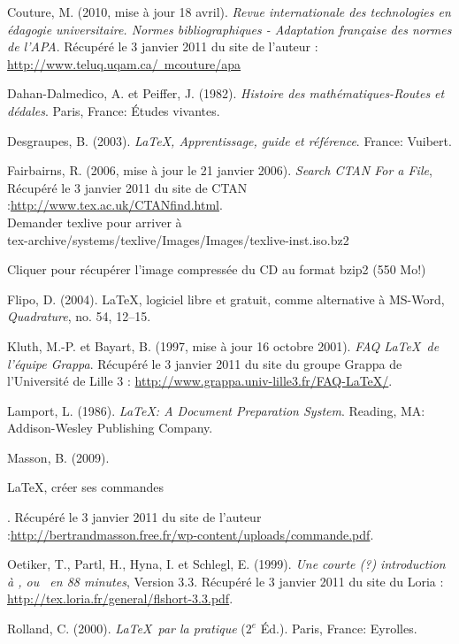 
\begin{thebibliography}{10}

 Couture, M. (2010, mise à jour 18 avril). {\em Revue internationale des technologies en édagogie universitaire. Normes bibliographiques - Adaptation française des normes de l'APA}. Récupéré le 3 janvier 2011 du site de l'auteur :  \href {http://www.teluq.uqam.ca/~mcouture/apa}{http://www.teluq.uqam.ca/~mcouture/apa}

 Dahan-Dalmedico, A.  et Peiffer, J. (1982). {\em Histoire des mathématiques-Routes et dédales}. Paris, France: Études vivantes.

 Desgraupes, B. (2003). {\em \LaTeX, Apprentissage, guide et référence}. France: Vuibert.

 Fairbairns, R. (2006, mise à jour le 21 janvier 2006). {\em Search CTAN For a File}, Récupéré le 3 janvier 2011 du site de CTAN :\href{http://www.tex.ac.uk/CTANfind.html}{http://www.tex.ac.uk/CTANfind.html}.\\
Demander texlive pour arriver à \\tex-archive/systems/texlive/Images/Images/texlive-inst.iso.bz2

Cliquer pour récupérer l'image compressée du CD au format bzip2 (550 Mo!)

 Flipo, D. (2004).  \LaTeX, logiciel libre et gratuit, comme alternative à MS-Word, {\em Quadrature}, no. 54, 12--15.

  Kluth, M.-P. et Bayart, B. (1997, mise à jour 16 octobre 2001). {\em FAQ  \LaTeX~de l'équipe Grappa}. Récupéré le 3 janvier 2011 du site du groupe Grappa de l'Université de Lille 3 : \href{http://www.grappa.univ-lille3.fr/FAQ-LaTeX/}{http://www.grappa.univ-lille3.fr/FAQ-LaTeX/}.

 Lamport, L. (1986). {\em \LaTeX: A Document Preparation System}. Reading, MA: Addison-Wesley Publishing Company.

 Masson, B. (2009). \begin{itshape}{\LaTeX, créer ses commandes}\end{itshape}. Récupéré le 3 janvier 2011 du site de l'auteur :\href {http://bertrandmasson.free.fr/wp-content/uploads/commande.pdf}{http://bertrandmasson.free.fr/wp-content/uploads/commande.pdf}.

 Oetiker, T., Partl, H., Hyna, I. et Schlegl, E. (1999). {\em Une courte (?) introduction à \LaTeXe, ou  \LaTeXe~en 88 minutes}, Version 3.3. Récupéré le 3 janvier 2011 du site du Loria : \href{http://tex.loria.fr/general/flshort-3.3.pdf}{http://tex.loria.fr/general/flshort-3.3.pdf}.

Rolland, C. (2000). {\em \LaTeX~par la pratique} ($2^e$ Éd.). Paris, France: Eyrolles.

\end{thebibliography}
